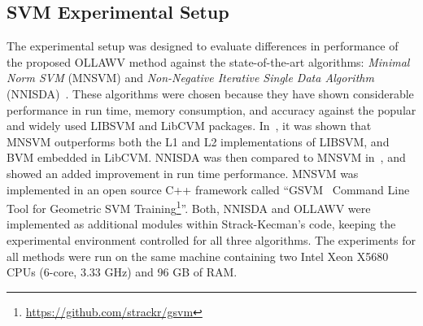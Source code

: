 \documentclass[reqno]{vcuthesis}
\numberwithin{equation}{chapter}
\begin{document}
\subsection{SVM Experimental Setup}\label{subsec:expsvm}
The experimental setup was designed to evaluate differences in performance of the proposed OLLAWV method against the state-of-the-art algorithms: \textit{Minimal Norm SVM} (MNSVM) \cite{strack2013geometric} and \textit{Non-Negative Iterative Single Data Algorithm} (NNISDA)~\cite{zigic2016}. These algorithms were chosen because they have shown considerable performance in run time, memory consumption, and accuracy against the popular and widely used LIBSVM and LibCVM packages. In~\cite{strack2013geometric}, it was shown that MNSVM outperforms both the L1 and L2 implementations of LIBSVM, and BVM embedded in LibCVM. NNISDA was then compared to MNSVM in~\cite{zigic2016}, and showed an added improvement in run time performance. MNSVM was implemented in an open source C++ framework called ``GSVM \textendash ~Command Line Tool for Geometric SVM Training\footnote{\url{https://github.com/strackr/gsvm}}''. Both, NNISDA and OLLAWV were implemented as additional modules within Strack-Kecman's code, keeping the experimental environment controlled for all three algorithms. The experiments for all methods were run on the same machine containing two Intel Xeon X5680 CPUs (6-core, 3.33 GHz) and 96 GB of RAM.
\end{document}

